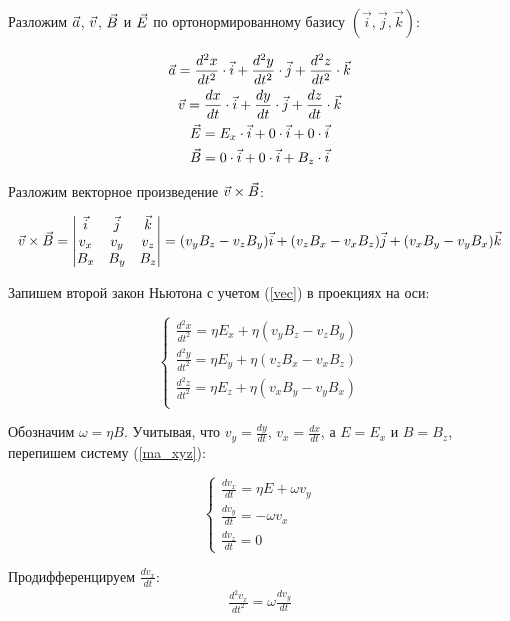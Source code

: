 Разложим $\vec{a}$, $\vec{v}$, $\vec{B}$ и $\vec{E}$ по ортонормированному базису $(\vec{i},\vec{j},\vec{k})$:

\begin{gather}
	\vec{a}=\frac{d^2x}{dt^2}\cdot\vec{i}+\frac{d^2y}{dt^2}\cdot\vec{j}+\frac{d^2z}{dt^2}\cdot\vec{k}\\
	\vec{v}=\frac{dx}{dt}\cdot\vec{i}+\frac{dy}{dt}\cdot\vec{j}+\frac{dz}{dt}\cdot\vec{k}\\
	\vec{E}=E_x\cdot\vec{i}+0\cdot\vec{i}+0\cdot\vec{i}\\
	\vec{B}=0\cdot\vec{i}+0\cdot\vec{i}+B_z\cdot\vec{i}
\end{gather}

Разложим векторное произведение $\vec{v}\times\vec{B}$:

\begin{gather}
	\label{vec}
	\vec{v}\times\vec{B} = \begin{vmatrix} \vec{i} & \vec{j} & \vec{k} \\ v_x & v_y & v_z \\ B_x & B_y & B_z \end{vmatrix}=(v_yB_z-v_zB_y)\vec{i}+(v_zB_x-v_xB_z)\vec{j}+(v_xB_y-v_yB_x)\vec{k}
\end{gather}

Запишем второй закон Ньютона с учетом (\ref{vec}) в проекциях на оси:

\begin{equation}
\label{ma_xyz}
 \begin{cases}
   \frac{d^2x}{dt^2}=\eta{}E_x+\eta(v_yB_z-v_zB_y)\\
   \frac{d^2y}{dt^2}=\eta{}E_y+\eta(v_zB_x-v_xB_z)\\
   \frac{d^2z}{dt^2}=\eta{}E_z+\eta(v_xB_y-v_yB_x)\\
 \end{cases}
\end{equation}

Обозначим $\omega=\eta{B}$. Учитывая, что $v_y=\frac{dy}{dt}$, $v_x=\frac{dx}{dt}$,  а $E=E_x$ и $B=B_z$, перепишем систему (\ref{ma_xyz}):

\begin{equation}
\begin{cases}
  \label{dv}
   \frac{dv_x}{dt}=\eta{}E+\omega{}v_y 	\\
   \frac{dv_y}{dt}=-\omega{}v_x			\\
   \frac{dv_z}{dt}=0 
\end{cases} 
\end{equation}

Продифференцируем $\frac{dv_x}{dt}$:
\begin{gather}
	\label{diff_dvx}
	\frac{d^2v_x}{dt^2}=\omega{}\frac{dv_y}{dt}
\end{gather}

